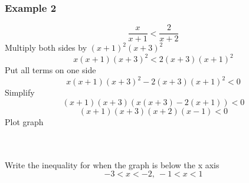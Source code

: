 \documentclass{article}[18pt]
\begin{document}
\subsubsection{Example 2}
$$\frac{x}{x+1}<\frac{2}{x+2}$$
Multiply both sides by $(x+1)^2(x+3)^2$
$$x(x+1)(x+3)^2<2(x+3)(x+1)^2$$
Put all terms on one side
$$x(x+1)(x+3)^2-2(x+3)(x+1)^2<0$$
Simplify
$$(x+1)(x+3)(x(x+3)-2(x+1))<0$$
$$(x+1)(x+3)(x+2)(x-1)<0$$
Plot graph\\
\\
\\
Write the inequality for when the graph is below the x axis
$$-3<x<-2, \ -1<x<1$$
\end{document}
